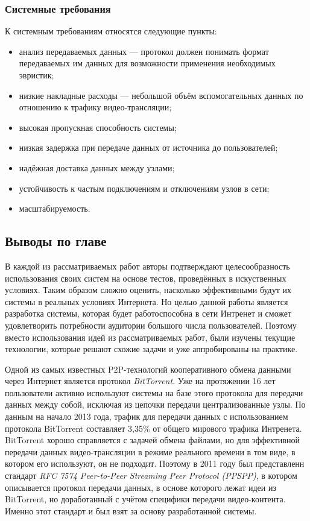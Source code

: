 		\subsubsection{Системные требования}
		К системным требованиям относятся следующие пункты:
		\begin{itemize}
			\item анализ передаваемых данных --- протокол должен понимать формат передаваемых им данных для возможности
			применения необходимых эвристик;
			\item низкие накладные расходы --- небольшой объём вспомогательных данных по отношению к трафику
			видео-трансляции;
			\item высокая пропускная способность системы;
			\item низкая задержка при передаче данных от источника до пользователей;
			\item надёжная доставка данных между узлами;
			\item устойчивость к частым подключениям и отключениям узлов в сети;
			\item масштабируемость.
		\end{itemize}

	\subsection{Выводы по главе}

	В каждой из рассматриваемых работ авторы подтверждают целесообразность использования своих систем на основе
	тестов, проведённых в искуственных условиях. Таким образом сложно оценить, насколько эффективными будут
	их системы в реальных условиях Интернета. Но целью данной работы является разработка системы, которая будет
	работоспособна в сети Интренет и сможет удовлетворить потребности аудитории большого числа пользователей.
	Поэтому вместо использования идей из рассматриваемых работ, были изучены текущие технологии, которые решают
	схожие задачи и уже аппробированы на практике.

	Одной из самых известных P2P-технологий кооперативного обмена данными через Интернет является протокол
	\textit{BitTorrent}. Уже на протяжении 16 лет пользователи активно используют системы на базе этого протокола для
	передачи данных между собой, исключая из цепочки передачи централизованные узлы. По данным на начало 2013 года,
	трафик для передачи данных с использованием протокола BitTorrent составляет 3,35\% от общего мирового трафика
	Интренета. BitTorrent хорошо справляется с задачей обмена файлами, но для эффективной передачи данных
	видео-трансляции в режиме реального времени в том виде, в котором его используют, он не подходит. Поэтому в 2011
	году был представленн стандарт \textit{RFC 7574 Peer-to-Peer Streaming Peer Protocol (PPSPP)}, в котором описывается
	протокол передачи данных, в основе которого лежат идеи из BitTorrent, но доработанный с учётом специфики передачи
	видео-контента. Именно этот стандарт и был взят за основу разработанной системы.

